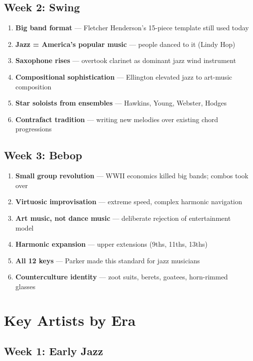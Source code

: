 \documentclass[11pt,letterpaper]{article}
\begin{document}
\subsection{\textcolor{week2color}{Week 2: Swing}}
\begin{enumerate}[leftmargin=1.5em]
  \item \textbf{Big band format} --- Fletcher Henderson's 15-piece template still used today
  \item \textbf{Jazz = America's popular music} --- people danced to it (Lindy Hop)
  \item \textbf{Saxophone rises} --- overtook clarinet as dominant jazz wind instrument
  \item \textbf{Compositional sophistication} --- Ellington elevated jazz to art-music composition
  \item \textbf{Star soloists from ensembles} --- Hawkins, Young, Webster, Hodges
  \item \textbf{Contrafact tradition} --- writing new melodies over existing chord progressions
\end{enumerate}

\subsection{\textcolor{week3color}{Week 3: Bebop}}
\begin{enumerate}[leftmargin=1.5em]
  \item \textbf{Small group revolution} --- WWII economics killed big bands; combos took over
  \item \textbf{Virtuosic improvisation} --- extreme speed, complex harmonic navigation
  \item \textbf{Art music, not dance music} --- deliberate rejection of entertainment model
  \item \textbf{Harmonic expansion} --- upper extensions (9ths, 11ths, 13ths)
  \item \textbf{All 12 keys} --- Parker made this standard for jazz musicians
  \item \textbf{Counterculture identity} --- zoot suits, berets, goatees, horn-rimmed glasses
\end{enumerate}

\section{Key Artists by Era}

\subsection{\textcolor{week1color}{Week 1: Early Jazz}}
\end{document}
